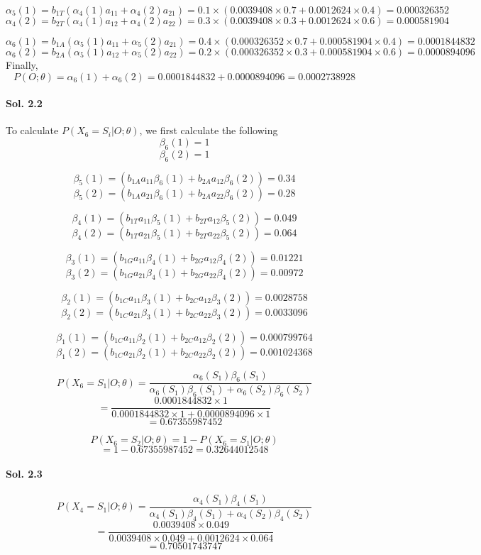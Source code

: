 \documentclass[]{report}
\begin{document}
	\[ \alpha_5(1) = b_{1T} (\alpha_4 (1) a_{11} + \alpha_4 (2) a_{21}) = 0.1 \times (0.0039408 \times 0.7 + 0.0012624 \times 0.4) = 0.000326352 \]
	\[ \alpha_4(2) = b_{2T} (\alpha_4 (1) a_{12} + \alpha_4(2) a_{22}) = 0.3 \times (0.0039408 \times 0.3 + 0.0012624 \times 0.6) = 0.000581904 \]	

	\[ \alpha_6(1) = b_{1A} (\alpha_5 (1) a_{11} + \alpha_5 (2) a_{21}) = 0.4 \times (0.000326352 \times 0.7 + 0.000581904 \times 0.4) = 0.0001844832 \]
	\[ \alpha_6(2) = b_{2A} (\alpha_5 (1) a_{12} + \alpha_5 (2) a_{22}) = 0.2 \times (0.000326352 \times 0.3 + 0.000581904 \times 0.6) = 0.0000894096 \]	
	Finally,  
	\[ P(O;\theta) = \alpha_6(1) + \alpha_6(2) = 0.0001844832 + 0.0000894096 = 0.0002738928 \]

\paragraph{Sol. 2.2}
	To calculate $P(X_6 = S_i|O;\theta)$, we first calculate the following
	\[ \beta_6(1) = 1 \]
	\[ \beta_6(2) = 1 \]

	\[ \beta_5(1) = (b_{1A}a_{11}\beta_6(1) + b_{2A}a_{12}\beta_6(2)) =  0.34\]
	\[ \beta_5(2) = (b_{1A}a_{21}\beta_6(1) + b_{2A}a_{22}\beta_6(2)) =  0.28\]

	\[ \beta_4(1) = (b_{1T}a_{11}\beta_5(1) + b_{2T}a_{12}\beta_5(2)) =  0.049 \]
	\[ \beta_4(2) = (b_{1T}a_{21}\beta_5(1) + b_{2T}a_{22}\beta_5(2)) =  0.064 \]

	\[ \beta_3(1) = (b_{1G}a_{11}\beta_4(1) + b_{2G}a_{12}\beta_4(2)) =  0.01221\]
	\[ \beta_3(2) = (b_{1G}a_{21}\beta_4(1) + b_{2G}a_{22}\beta_4(2)) =  0.00972\]

	\[ \beta_2(1) = (b_{1C}a_{11}\beta_3(1) + b_{2C}a_{12}\beta_3(2)) =  0.0028758\]
	\[ \beta_2(2) = (b_{1C}a_{21}\beta_3(1) + b_{2C}a_{22}\beta_3(2)) =  0.0033096\]

	\[ \beta_1(1) = (b_{1C}a_{11}\beta_2(1) + b_{2C}a_{12}\beta_2(2)) =  0.000799764\]
	\[ \beta_1(2) = (b_{1C}a_{21}\beta_2(1) + b_{2C}a_{22}\beta_2(2)) =  0.001024368\]

	\[ P(X_6 = S_1 | O;\theta) = \frac{\alpha_6(S_1) \beta_6(S_1)}{\alpha_6(S_1) \beta_6(S_1) + \alpha_6(S_2) \beta_6(S_2)} \]
	\[  = \frac{0.0001844832 \times 1}{0.0001844832 \times 1 + 0.0000894096 \times 1}\]
	\[ = 0.67355987452 \]

	\[ P(X_6 = S_2 | O;\theta) = 1 - P(X_6 = S_1 | O;\theta) \]
	\[ = 1 - 0.67355987452 = 0.32644012548 \]

\paragraph{Sol. 2.3}
	\[ P(X_4 = S_1 | O;\theta) = \frac{\alpha_4(S_1) \beta_4(S_1)}{\alpha_4(S_1) \beta_4(S_1) + \alpha_4(S_2) \beta_4(S_2)} \]
	\[  = \frac{0.0039408 \times 0.049}{0.0039408 \times 0.049 + 0.0012624 \times 0.064}\]
	\[ = 0.70501743747 \]
\end{document}
